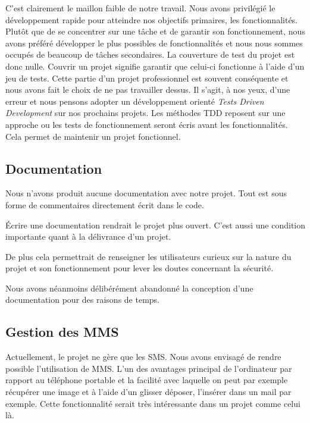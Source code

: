 C'est clairement le maillon faible de notre travail.
Nous avons privilégié le développement rapide pour atteindre nos objectifs primaires, les fonctionnalités.
Plutôt que de se concentrer sur une tâche et de garantir son fonctionnement, nous avons préféré développer le plus possibles de fonctionnalités et nous nous sommes occupés de beaucoup de tâches secondaires.
La couverture de test du projet est donc nulle.
Couvrir un projet signifie garantir que celui-ci fonctionne à l'aide d'un jeu de tests.
Cette partie d'un projet professionnel est souvent conséquente et nous avons fait le choix de ne pas travailler dessus.
Il s'agit, à nos yeux, d'une erreur et nous pensons adopter un développement orienté \textit{Tests Driven Development} sur nos prochains projets.
Les méthodes TDD reposent sur une approche ou les tests de fonctionnement seront écris avant les fonctionnalités.
Cela permet de maintenir un projet fonctionnel.




\subsection{Documentation}

Nous n'avons produit aucune documentation avec notre projet.
Tout est sous forme de commentaires directement écrit dans le code.

Écrire une documentation rendrait le projet plus ouvert.
C'est aussi une condition importante quant à la délivrance d'un projet.

De plus cela permettrait de renseigner les utilisateurs curieux sur la nature du projet et son fonctionnement pour lever les doutes concernant la sécurité.

Nous avons néanmoins délibérément abandonné la conception d'une documentation pour des raisons de temps.




\subsection{Gestion des MMS}

Actuellement, le projet ne gère que les SMS.
Nous avons envisagé de rendre possible l'utilisation de MMS.
L'un des avantages principal de l'ordinateur par rapport au téléphone portable et la facilité avec laquelle on peut par exemple récupérer une image et à l'aide d'un glisser déposer, l'insérer dans un mail par exemple.
Cette fonctionnalité serait très intéressante dans un projet comme celui là.
